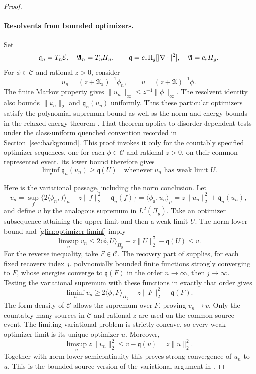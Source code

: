 \begin{proof}
\paragraph{Resolvents from bounded optimizers.}
Set
\[
 \mathfrak q_n=T_n\mathcal E,\quad \mathfrak A_n=T_nH_n,\qquad
 \mathfrak q=c_*\Pi_g[|\nabla\cdot|^2],\quad \mathfrak A=c_*H_g.
\]
For \(\phi\in\mathscr C\) and rational \(z>0\), consider
\[
 u_n=(z+\mathfrak A_n)^{-1}\phi_n,\qquad
 u=(z+\mathfrak A)^{-1}\phi.
\]
The finite Markov property gives
\(\|u_n\|_\infty\le z^{-1}\|\phi\|_\infty\).
The resolvent identity also bounds \(\|u_n\|_2\) and
\(\mathfrak q_n(u_n)\) uniformly.  Thus these particular optimizers
satisfy the polynomial supremum bound as well as the norm and energy
bounds in the relaxed-energy theorem
\cite[Theorem~6.8]{FUA}.  That theorem applies to disorder-dependent
tests under the class-uniform quenched convention recorded in
Section~\ref{sec:background}.  This proof invokes it only for the
countably specified optimizer sequences, one for each
\(\phi\in\mathscr C\) and rational \(z>0\), on their common
represented event.  Its lower bound therefore gives
\begin{equation}
 \liminf_n\mathfrak q_n(u_n)\ge\mathfrak q(U)
 \quad\text{whenever \(u_n\) has weak limit \(U\)}.
 \label{glim:optimizer-liminf}
\end{equation}

Here is the variational passage, including the norm conclusion.  Let
\[
 v_n=\sup_f\{2\langle\phi_n,f\rangle_\mu-z\|f\|_2^2-\mathfrak q_n(f)\}
     =\langle\phi_n,u_n\rangle_\mu
     =z\|u_n\|_2^2+\mathfrak q_n(u_n),
\]
and define \(v\) by the analogous supremum in \(L^2(\Pi_g)\).  Take an
optimizer subsequence attaining the upper limit and then a weak limit
\(U\).  The norm lower bound and
\eqref{glim:optimizer-liminf} imply
\[
 \limsup_n v_n
 \le 2\langle\phi,U\rangle_{\Pi_g}
       -z\|U\|_2^2-\mathfrak q(U)
 \le v.
\]
For the reverse inequality, take \(F\in\mathscr C\).
The recovery part of \cite[Theorem~6.8]{FUA} supplies, for each fixed
recovery index \(j\), polynomially bounded finite functions strongly
converging to \(F\), whose energies converge to \(\mathfrak q(F)\) in
the order \(n\to\infty\), then \(j\to\infty\).  Testing the variational
supremum with these functions in exactly that order gives
\[
 \liminf_n v_n\ge
 2\langle\phi,F\rangle_{\Pi_g}-z\|F\|_2^2-\mathfrak q(F).
\]
The form density of \(\mathscr C\) allows the supremum over \(F\),
proving \(v_n\to v\).
Only the countably many sources in \(\mathscr C\) and rational \(z\)
are used on the common source event.
The limiting variational problem is strictly concave, so every weak
optimizer limit is its unique optimizer \(u\).  Moreover,
\[
 \limsup_n z\|u_n\|_2^2
 \le v-\mathfrak q(u)=z\|u\|_2^2.
\]
Together with norm lower semicontinuity this proves strong convergence
of \(u_n\) to \(u\).  This is the bounded-source version of the
variational argument in \cite[proof of Lemma~7.2]{FUA}.


\end{proof}
